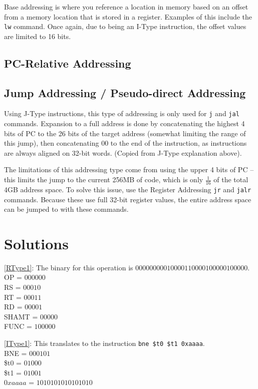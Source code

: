 \documentclass{article}
\begin{document}
Base addressing is where you reference a location in memory based on an offset from a memory location that is stored in a register. Examples of this include the \texttt{lw} command. Once again, due to being an I-Type instruction, the offset values are limited to 16 bits. 


\subsection{PC-Relative Addressing}

\subsection{Jump Addressing / Pseudo-direct Addressing}

Using J-Type instructions, this type of addressing is only used for \texttt{j} and \texttt{jal} commands. Expansion to a full address is done by concatenating the highest 4 bits of PC to the 26 bits of the target address (somewhat limiting the range of this jump), then concatenating 00 to the end of the instruction, as instructions are always aligned on 32-bit words. (Copied from J-Type explanation above).

The limitations of this addressing type come from using the upper 4 bits of PC -- this limits the jump to the current 256MB of code, which is only $\frac{1}{16}$ of the total 4GB address space. To solve this issue, use the Register Addressing \texttt{jr} and \texttt{jalr} commands. Because these use full 32-bit register values, the entire address space can be jumped to with these commands. 


\section{Solutions}

\ref{RType1}: The binary for this operation is $000000 00010 00011 00001 00000 100000$. \\ OP = $000000$ \\ RS = $00010$ \\ RT = $00011$ \\ RD = $00001$ \\ SHAMT = $00000$ \\ FUNC = $100000$

\ref{IType1}: This translates to the instruction \texttt{bne \$t0 \$t1 0xaaaa}. \\ BNE = $000101$ \\ \$t0 = $01000$ \\ \$t1 = $01001$ \\ $0xaaaa$ = $1010101010101010$

\printindex
\end{document}
